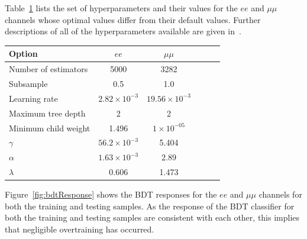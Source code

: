 Table~\ref{tab:hyperparameters} lists the set of hyperparameters and their values for the $ee$ and $\mu\mu$ channels whose optimal values differ from their default values.
Further descriptions of all of the hyperparameters available are given in~\cite{xgboost}.

\begin{table}[htbp]
\label{tab:hyperparameters}
  \centering
\begin{tabular}{lccccc}
   \hline
   \textbf{Option} & \textbf{$ee$} & \textbf{$\mu\mu$}\\
   \hline
    Number of estimators & 5000 & 3282 \\
    Subsample & 0.5 & 1.0 \\
    Learning rate & $2.82\times10^{-3}$ & $19.56\times10^{-3}$  \\
    Maximum tree depth & 2 & 2\\
    Minimum child weight & 1.496 & $1\times10^{-05}$ \\
    $\gamma$ & $56.2\times10^{-3}$ & 5.404 \\
    $\alpha$ & $1.63\times10^{-3}$ & $2.89$ \\
    $\lambda$ & 0.606 & 1.473 \\
   \hline
 \end{tabular}%
\end{table}

Figure~\ref{fig:bdtResponse} shows the BDT responses for the $ee$ and $\mu\mu$ channels for both the training and testing samples.
As the response of the BDT classifier for both the training and testing samples are consistent with each other, this implies that negligible overtraining has occurred. 

